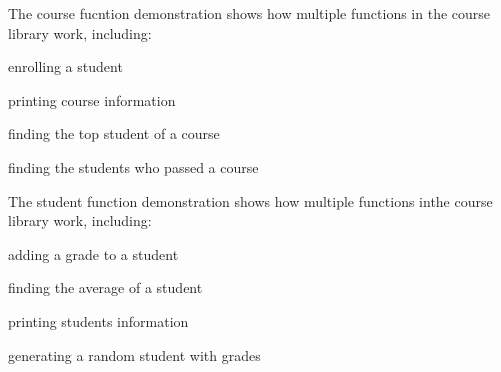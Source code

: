 The course fucntion demonstration shows how multiple functions in the course library work, including\+:
\begin{DoxyItemize}
\item enrolling a student
\item printing course information
\item finding the top student of a course
\item finding the students who passed a course
\end{DoxyItemize}

The student function demonstration shows how multiple functions inthe course library work, including\+:
\begin{DoxyItemize}
\item adding a grade to a student
\item finding the average of a student
\item printing student\textquotesingle{}s information
\item generating a random student with grades 
\end{DoxyItemize}